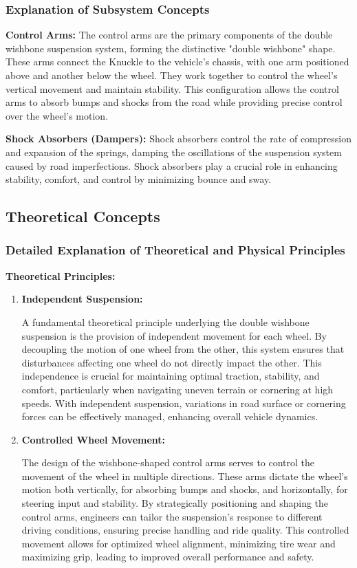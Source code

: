 \subsubsection{Explanation of Subsystem Concepts}
\textbf{Control Arms:} The control arms are the primary components of the double wishbone suspension system, forming the distinctive "double wishbone" shape. These arms connect the Knuckle to the vehicle's chassis, with one arm positioned above and another below the wheel. They work together to control the wheel's vertical movement and maintain stability. This configuration allows the control arms to absorb bumps and shocks from the road while providing precise control over the wheel's motion.

\textbf{Shock Absorbers (Dampers):} Shock absorbers control the rate of compression and expansion of the springs, damping the oscillations of the suspension system caused by road imperfections. Shock absorbers play a crucial role in enhancing stability, comfort, and control by minimizing bounce and sway.

\subsection{Theoretical Concepts}
\subsubsection{Detailed Explanation of Theoretical and Physical Principles}
\textbf{Theoretical Principles:}

\begin{enumerate}
    \item \textbf{Independent Suspension:}
    
    A fundamental theoretical principle underlying the double wishbone suspension is the provision of independent movement for each wheel. By decoupling the motion of one wheel from the other, this system ensures that disturbances affecting one wheel do not directly impact the other. This independence is crucial for maintaining optimal traction, stability, and comfort, particularly when navigating uneven terrain or cornering at high speeds. With independent suspension, variations in road surface or cornering forces can be effectively managed, enhancing overall vehicle dynamics.
    
\item \textbf{Controlled Wheel Movement:}
    
    The design of the wishbone-shaped control arms serves to control the movement of the wheel in multiple directions. These arms dictate the wheel's motion both vertically, for absorbing bumps and shocks, and horizontally, for steering input and stability. By strategically positioning and shaping the control arms, engineers can tailor the suspension's response to different driving conditions, ensuring precise handling and ride quality. This controlled movement allows for optimized wheel alignment, minimizing tire wear and maximizing grip, leading to improved overall performance and safety.
\end{enumerate}

